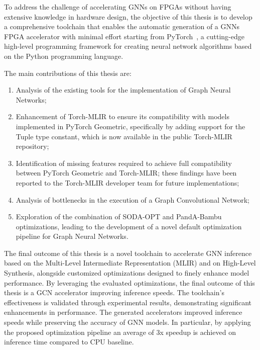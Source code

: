 \documentclass[11pt,a4paper,twocolumn]{article}
\begin{document}
To address the challenge of accelerating GNNs on FPGAs without having extensive knowledge in hardware design, the objective of this thesis is to develop a comprehensive toolchain that enables the automatic generation of a GNNs FPGA accelerator with minimal effort
starting from PyTorch~\cite{DBLP:journals/corr/abs-1912-01703}, a cutting-edge high-level programming framework for creating neural network algorithms based on the Python programming language.

The main contributions of this thesis are:
\begin{enumerate}
    \item Analysis of the existing tools for the implementation of Graph Neural Networks;
    \item Enhancement of Torch-MLIR to ensure its compatibility with models implemented in PyTorch Geometric, specifically by adding support for the Tuple type constant, which is now available in the public Torch-MLIR repository;
    \item Identification of missing features required to achieve full compatibility between PyTorch Geometric and Torch-MLIR; these findings have been reported to the Torch-MLIR developer team for future implementations;
    \item Analysis of bottlenecks in the execution of a Graph Convolutional Network;
    \item Exploration of the combination of SODA-OPT and PandA-Bambu optimizations, leading to the development of a novel default optimization pipeline for Graph Neural Networks.
\end{enumerate}

The final outcome of this thesis is a novel toolchain to accelerate GNN inference based on the Multi-Level Intermediate Representation (MLIR) and on High-Level Synthesis, alongside customized optimizations designed to finely enhance model performance.
By leveraging the evaluated optimizations, the final outcome of this thesis is a GCN accelerator improving inference speeds.
The toolchain's effectiveness is validated through experimental results, demonstrating significant enhancements in performance.
The generated accelerators improved inference speeds while preserving the accuracy of GNN models.
In particular, by applying the proposed optimization pipeline an average of 3x speedup is achieved on inference time compared to CPU baseline.


\end{document}
